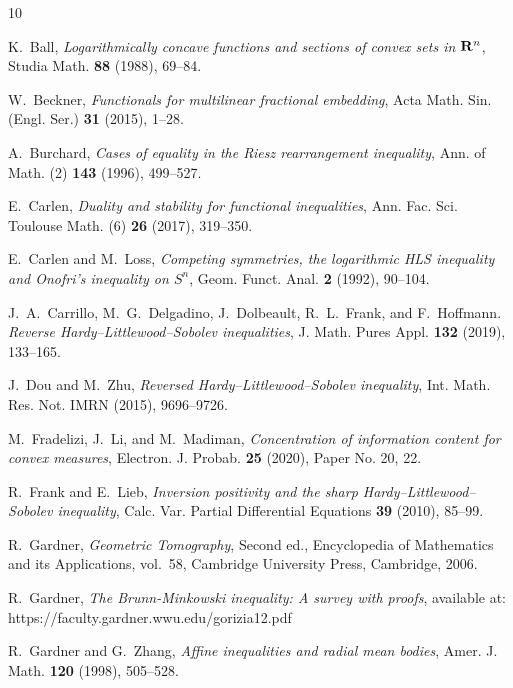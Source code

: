 \documentclass{amsart}
\begin{document}
\begin{thebibliography}{10}

K.~Ball, {\em Logarithmically concave functions and sections of convex sets in {${\bf R}\sp n$}}, Studia Math. {\bf 88} (1988), 69--84.

W.~Beckner, {\em Functionals for multilinear fractional embedding}, Acta Math. Sin. (Engl. Ser.) {\bf 31} (2015), 1--28.
 
A.~Burchard, {\em Cases of equality in the {R}iesz rearrangement inequality}, Ann. of Math. (2) {\bf 143} (1996),  499--527.

E.~Carlen, {\em Duality and stability for functional inequalities}, Ann. Fac. Sci. Toulouse Math. (6) {\bf 26} (2017), 319--350.

E.~Carlen and M.~Loss, {\em Competing symmetries, the logarithmic {HLS}   inequality and {O}nofri's inequality on {$S^n$}}, Geom. Funct. Anal. {\bf 2}  (1992), 90--104.

J.~A.~Carrillo, M.~G.~Delgadino, J.~Dolbeault, R.~L.~Frank, and F.~Hoffmann. {\em Reverse Hardy–Littlewood–Sobolev inequalities}, J. Math. Pures Appl. {\bf 132} (2019), 133--165.

J.~Dou and M.~Zhu, {\em Reversed {H}ardy--{L}ittlewood--{S}obolev inequality}, Int. Math. Res. Not. IMRN (2015), 9696--9726.

M.~Fradelizi, J.~Li, and M.~Madiman, {\em Concentration of information content
  for convex measures}, Electron. J. Probab. {\bf 25} (2020), Paper No. 20, 22.

R.~Frank and E.~Lieb, {\em Inversion positivity and the sharp {H}ardy--{L}ittlewood--{S}obolev inequality}, Calc. Var. Partial Differential Equations {\bf 39} (2010), 85--99.
  
R.~Gardner, {\em Geometric {T}omography}, Second ed., Encyclopedia of  Mathematics and its Applications, vol.~58, Cambridge University Press,  Cambridge, 2006.

R.~Gardner, {\em The Brunn-Minkowski inequality: A survey with proofs}, available at:  https://faculty.gardner.wwu.edu/gorizia12.pdf 
  
R.~Gardner and G.~Zhang, {\em Affine inequalities and radial mean bodies},  Amer. J. Math. {\bf 120} (1998), 505--528.


\end{thebibliography}
\end{document}

